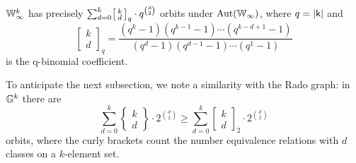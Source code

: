 \begin{proposition}\label{prop:symplectic-oligomorphic}
    $\mathbb{W}_\infty^k$ has precisely \(
        \sum_{d = 0}^k \begin{bsmallmatrix}k \\ d \end{bsmallmatrix}_q \cdot q^{\binom{d}{2}}
    \) orbits under $\operatorname{Aut}(\mathbb{W}_\infty)$,
    where $q = \vert \mathsf{k} \vert$ and \[
        \begin{bmatrix}k \\ d \end{bmatrix}_q 
        = \frac{
            (q^k - 1)(q^{k-1} - 1) \cdots (q^{k-d+1} - 1)
        }{
            (q^d - 1) (q^{d-1} - 1) \cdots (q^1 - 1)
        }
    \] is the q-binomial coefficient.
\end{proposition}
\begin{remark}
    To anticipate the next subsection, we note a similarity with the Rado graph: 
    in $\mathbb{G}^k$ there are \[
        \sum_{d=0}^k \left\{\begin{matrix}k \\ d \end{matrix}\right\} \cdot 2^{\binom{d}{2}}
        \geq 
        \sum_{d = 0}^k \begin{bmatrix}k \\ d \end{bmatrix}_2 \cdot 2^{\binom{d}{2}}
    \] orbits,
    where the curly brackets count the number equivalence relations with $d$ classes on a $k$-element set.
\end{remark}

